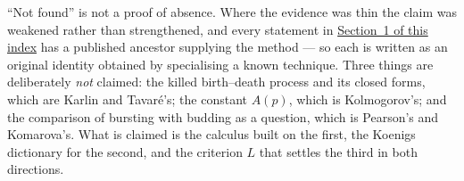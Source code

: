 
{\noindent
``Not found'' is not a proof of absence. Where the evidence was thin the claim was weakened
rather than strengthened, and every statement in \hyperref[oi:statements]{Section~1 of this index} has a published ancestor supplying
the method --- so each is written as an original identity obtained by specialising a known
technique. Three things are deliberately \emph{not} claimed: the killed birth--death process
and its closed forms, which are Karlin and Tavar\'e's; the constant $A(p)$, which is
Kolmogorov's; and the comparison of bursting with budding as a question, which is Pearson's
and Komarova's. What is claimed is the calculus built on the first, the Koenigs dictionary
for the second, and the criterion $L$ that settles the third in both directions.\par}


\endgroup
